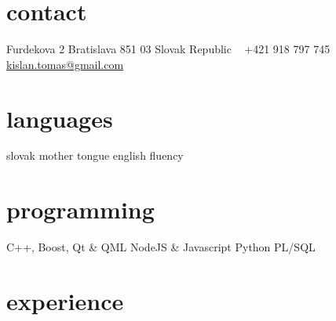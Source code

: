 \documentclass[]{friggeri-cv} %
\begin{document}


\begin{aside} %
\section{contact}
Furdekova 2
Bratislava 851 03
Slovak Republic
~
+421 918 797 745
~
\href{mailto:kislan.tomas@gmail.com}{kislan.tomas@gmail.com}
\section{languages}
slovak mother tongue
english fluency
\section{programming}
C++, Boost, Qt \& QML
NodeJS \& Javascript
Python
PL/SQL
\end{aside}


\section{experience}
\end{document}

